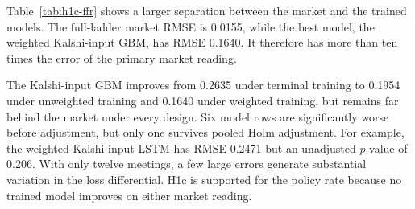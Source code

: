 \documentclass[12pt,a4paper]{report}
\begin{document}
Table~\ref{tab:h1c-ffr} shows a larger separation between the market and the
trained models. The full-ladder market RMSE is 0.0155, while the best model,
the weighted Kalshi-input GBM, has RMSE 0.1640. It therefore has more than ten
times the error of the primary market reading.

The Kalshi-input GBM improves from 0.2635 under terminal training to 0.1954
under unweighted training and 0.1640 under weighted training, but remains far
behind the market under every design. Six model rows are significantly worse
before adjustment, but only one survives pooled Holm adjustment. For example,
the weighted Kalshi-input LSTM has RMSE 0.2471 but an unadjusted $p$-value of
0.206. With only twelve meetings, a few large errors generate substantial
variation in the loss differential. H1c is supported for the policy rate
because no trained model improves on either market reading.
\end{document}

